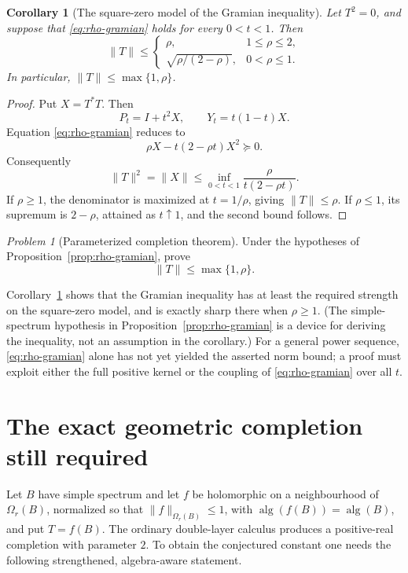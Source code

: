 \documentclass[11pt]{article}
\newtheorem{corollary}[theorem]{Corollary}
\theoremstyle{remark}
\newtheorem{problem}[theorem]{Problem}
\newcommand{\alg}{\operatorname{alg}}
\begin{document}
\begin{corollary}[The square-zero model of the Gramian inequality]
\label{cor:square-zero-completion}
Let \(T^2=0\), and suppose that \eqref{eq:rho-gramian} holds for
every \(0<t<1\).  Then
\[
 \|T\|\leq
 \begin{cases}
 \rho,&1\leq\rho\leq2,\\[1mm]
 \sqrt{\rho/(2-\rho)},&0<\rho\leq1.
 \end{cases}
\]
In particular, \(\|T\|\leq\max\{1,\rho\}\).
\end{corollary}

\begin{proof}
Put \(X=T^*T\).  Then
\[
 P_t=I+t^2X,\qquad Y_t=t(1-t)X.
\]
Equation \eqref{eq:rho-gramian} reduces to
\[
 \rho X-t(2-\rho t)X^2\succeq0.
\]
Consequently
\[
 \|T\|^2=\|X\|
 \leq\inf_{0<t<1}\frac{\rho}{t(2-\rho t)}.
\]
If \(\rho\geq1\), the denominator is maximized at \(t=1/\rho\),
giving \(\|T\|\leq\rho\).  If \(\rho\leq1\), its supremum is
\(2-\rho\), attained as \(t\uparrow1\), and the second bound follows.
\end{proof}

\begin{problem}[Parameterized completion theorem]
\label{prob:parameterized-completion}
Under the hypotheses of Proposition~\ref{prop:rho-gramian}, prove
\[
 \|T\|\leq\max\{1,\rho\}.
\]
\end{problem}

Corollary~\ref{cor:square-zero-completion} shows that the Gramian
inequality has at least the required strength on the square-zero
model, and is exactly sharp there when \(\rho\geq1\).
(The simple-spectrum hypothesis in
Proposition~\ref{prop:rho-gramian} is a device for deriving the
inequality, not an assumption in the corollary.)  For a general power sequence,
\eqref{eq:rho-gramian} alone has not yet yielded the asserted norm
bound; a proof must exploit either the full positive kernel or the
coupling of \eqref{eq:rho-gramian} over all \(t\).

\section{The exact geometric completion still required}

Let \(B\) have simple spectrum and let \(f\) be holomorphic on a
neighbourhood of \(\Omega_r(B)\), normalized so that
\(\|f\|_{\Omega_r(B)}\leq1\), with
\(\alg(f(B))=\alg(B)\), and put \(T=f(B)\).
The ordinary double-layer calculus produces a positive-real
completion with parameter \(2\).  To obtain the conjectured constant
one needs the following strengthened, algebra-aware statement.
\end{document}

